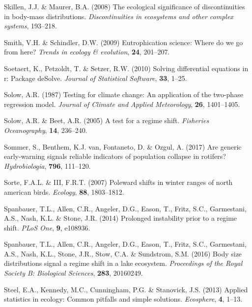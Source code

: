 \documentclass[12pt,twoside,openany]{reedthesis}
\begin{document}
\leavevmode\hypertarget{ref-skillen2008ecological}{}%
Skillen, J.J. \& Maurer, B.A. (2008) The ecological significance of discontinuities in body-mass distributions. \emph{Discontinuities in ecosystems and other complex systems}, 193--218.

\leavevmode\hypertarget{ref-smith2009eutrophication}{}%
Smith, V.H. \& Schindler, D.W. (2009) Eutrophication science: Where do we go from here? \emph{Trends in ecology \& evolution}, \textbf{24}, 201--207.

\leavevmode\hypertarget{ref-deSolve}{}%
Soetaert, K., Petzoldt, T. \& Setzer, R.W. (2010) Solving differential equations in r: Package deSolve. \emph{Journal of Statistical Software}, \textbf{33}, 1--25.

\leavevmode\hypertarget{ref-solow1987testing}{}%
Solow, A.R. (1987) Testing for climate change: An application of the two-phase regression model. \emph{Journal of Climate and Applied Meteorology}, \textbf{26}, 1401--1405.

\leavevmode\hypertarget{ref-solow_test_2005}{}%
Solow, A.R. \& Beet, A.R. (2005) A test for a regime shift. \emph{Fisheries Oceanography}, \textbf{14}, 236--240.

\leavevmode\hypertarget{ref-sommer2017generic}{}%
Sommer, S., Benthem, K.J. van, Fontaneto, D. \& Ozgul, A. (2017) Are generic early-warning signals reliable indicators of population collapse in rotifers? \emph{Hydrobiologia}, \textbf{796}, 111--120.

\leavevmode\hypertarget{ref-sorte2007poleward}{}%
Sorte, F.A.L. \& III, F.R.T. (2007) Poleward shifts in winter ranges of north american birds. \emph{Ecology}, \textbf{88}, 1803--1812.

\leavevmode\hypertarget{ref-spanbauer_prolonged_2014}{}%
Spanbauer, T.L., Allen, C.R., Angeler, D.G., Eason, T., Fritz, S.C., Garmestani, A.S., Nash, K.L. \& Stone, J.R. (2014) Prolonged instability prior to a regime shift. \emph{PLoS One}, \textbf{9}, e108936.

\leavevmode\hypertarget{ref-spanbauer2016body}{}%
Spanbauer, T.L., Allen, C.R., Angeler, D.G., Eason, T., Fritz, S.C., Garmestani, A.S., Nash, K.L., Stone, J.R., Stow, C.A. \& Sundstrom, S.M. (2016) Body size distributions signal a regime shift in a lake ecosystem. \emph{Proceedings of the Royal Society B: Biological Sciences}, \textbf{283}, 20160249.

\leavevmode\hypertarget{ref-steel2013applied}{}%
Steel, E.A., Kennedy, M.C., Cunningham, P.G. \& Stanovick, J.S. (2013) Applied statistics in ecology: Common pitfalls and simple solutions. \emph{Ecosphere}, \textbf{4}, 1--13.
\end{document}
